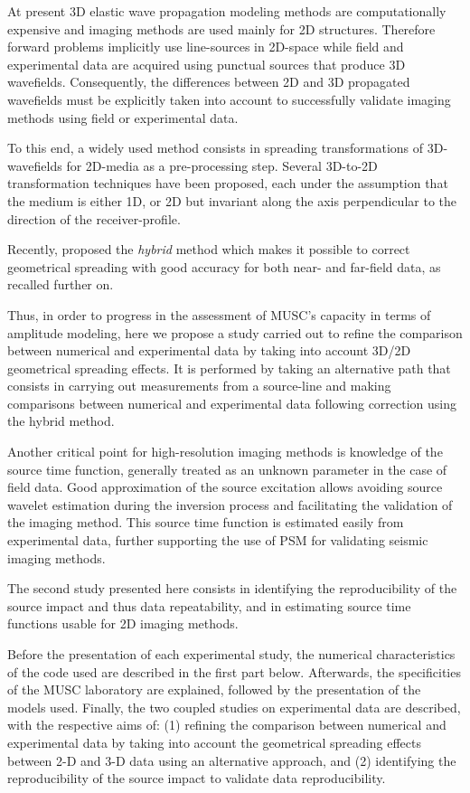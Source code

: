 \documentclass[manuscript,revised]{geophysics}
\newcommand{\twod}{2-D }
\newcommand{\thrd}{3-D }
\begin{document}
\noindent At present 3D elastic wave propagation modeling methods are computationally expensive and imaging methods are used mainly for 2D structures. Therefore forward problems implicitly use line-sources in 2D-space while field and experimental data are acquired using punctual sources that produce 3D wavefields. Consequently, the differences between 2D and 3D propagated wavefields must be explicitly taken into account to successfully validate imaging methods using field or experimental data. 

\noindent To this end, a widely used method consists in spreading transformations of 3D-wavefields for 2D-media as a pre-processing step. Several 3D-to-2D transformation techniques have been proposed, each under the assumption that the medium is either 1D, or 2D but invariant along the axis perpendicular to the direction of the receiver-profile.

\noindent Recently, \citet{Forbriger_LSS_2014} proposed the \textit{hybrid} method which makes it possible to correct geometrical spreading with good accuracy for both near- and far-field data, as recalled further on.

\noindent Thus, in order to progress in the assessment of MUSC’s capacity in terms of amplitude modeling, here we propose a study carried out to refine the comparison between numerical and experimental data by taking into account 3D/2D geometrical spreading effects. It is performed by taking an alternative path that consists in carrying out measurements from a source-line and making comparisons between numerical and experimental data following correction using the hybrid method.


\noindent Another critical point for high-resolution imaging methods is knowledge of the source time function, generally treated as an unknown parameter in the case of field data. Good approximation of the source excitation allows avoiding source wavelet estimation during the inversion process and facilitating the validation of the imaging method. This source time function is estimated easily from experimental data, further supporting the use of PSM for validating seismic imaging methods.

\noindent The second study presented here consists in identifying the reproducibility of the source impact and thus data repeatability, and in estimating source time functions usable for 2D imaging methods.

\noindent Before the presentation of each experimental study, the numerical characteristics of the code used are described in the first part below. Afterwards, the specificities of the MUSC laboratory are explained, followed by the presentation of the models used. Finally, the two coupled studies on experimental data are described, with the respective aims of: (1) refining the comparison between numerical and experimental data by taking into account the geometrical spreading effects between \twod and \thrd data using an alternative approach, and (2) identifying the reproducibility of the source impact to validate data reproducibility.
\end{document}
